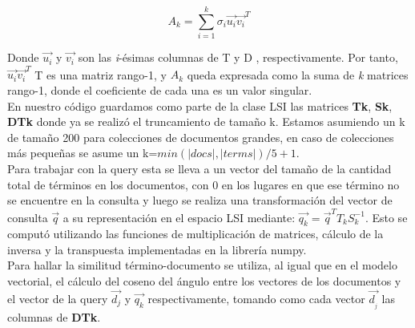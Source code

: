 \documentclass[spanish]{article}
\begin{document}
$$A_{k}=\sum^{k}_{i=1}\sigma_{i}\vec{u_{i}}\vec{v_{i}}^{T}$$

Donde $\vec{u_{i}}$ y $\vec{v_{i}}$ son las \textit{i}-ésimas columnas de T y D , respectivamente. Por tanto, $\vec{u_{i}}\vec{v_{i}}^{T}$ T es una matriz rango-1, y $A_{k}$ queda expresada como la suma de \textit{k} matrices rango-1, donde el coeficiente de cada una es un valor singular.\\

En nuestro código guardamos como parte de la clase LSI las matrices  \textbf{Tk}, \textbf{Sk}, \textbf{DTk} donde ya se realizó el truncamiento de tamaño k. Estamos asumiendo un k de tamaño 200 para colecciones de documentos grandes, en caso de colecciones más pequeñas se asume un k=$min(|docs|,|terms|)/5+1$. \\

Para trabajar con la query esta se lleva a un vector del tamaño de la cantidad total de términos en los documentos, con 0 en los lugares en que ese término no se encuentre en la consulta y luego se realiza una transformación del vector de consulta $\vec{q}$ a su representación en el espacio LSI mediante: $\vec{q_{k}}=\vec{q}^{T}T_{k}S_{k}^{-1}$. Esto se computó utilizando las funciones de multiplicación de matrices, cálculo de la inversa y la transpuesta implementadas en la librería numpy. \\

Para hallar la similitud término-documento se utiliza, al igual que en el modelo vectorial, el cálculo del coseno del ángulo entre los vectores de los documentos y el vector de la query $\vec{d_{j}}$ y $\vec{q_{k}}$ respectivamente, tomando como cada vector $\vec{d_{_{j}}}$ las columnas de \textbf{DTk}.
\end{document}
